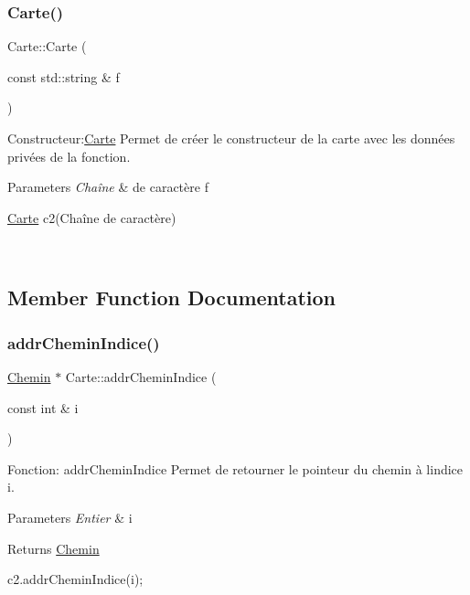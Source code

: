 \subsubsection{\texorpdfstring{Carte()}{Carte()}\hspace{0.1cm}{\footnotesize\ttfamily [3/3]}}
{\footnotesize\ttfamily Carte\+::\+Carte (\begin{DoxyParamCaption}\item[{const std\+::string \&}]{f }\end{DoxyParamCaption})}



Constructeur\+:\hyperlink{classCarte}{Carte} Permet de créer le constructeur de la carte avec les données privées de la fonction. 


\begin{DoxyParams}{Parameters}
{\em Chaîne} & de caractère f 
\begin{DoxyCode}
\hyperlink{classCarte}{Carte} c2(Chaîne de caractère)
\end{DoxyCode}
 \\
\hline
\end{DoxyParams}


\subsection{Member Function Documentation}
\mbox{\label{classCarte_a16a507cb5eb10f57f0d34052db75689c}} 
\subsubsection{\texorpdfstring{addr\+Chemin\+Indice()}{addrCheminIndice()}}
{\footnotesize\ttfamily \hyperlink{classChemin}{Chemin} $\ast$ Carte\+::addr\+Chemin\+Indice (\begin{DoxyParamCaption}\item[{const int \&}]{i }\end{DoxyParamCaption})}



Fonction\+: addr\+Chemin\+Indice Permet de retourner le pointeur du chemin à l\textquotesingle{}indice i. 


\begin{DoxyParams}{Parameters}
{\em Entier} & i \\
\hline
\end{DoxyParams}
\begin{DoxyReturn}{Returns}
\hyperlink{classChemin}{Chemin} 
\begin{DoxyCode}
c2.addrCheminIndice(i);
\end{DoxyCode}
 
\end{DoxyReturn}
\mbox{\label{classCarte_a573a9aa2b9917152357b710fe0be6ecc}} 
